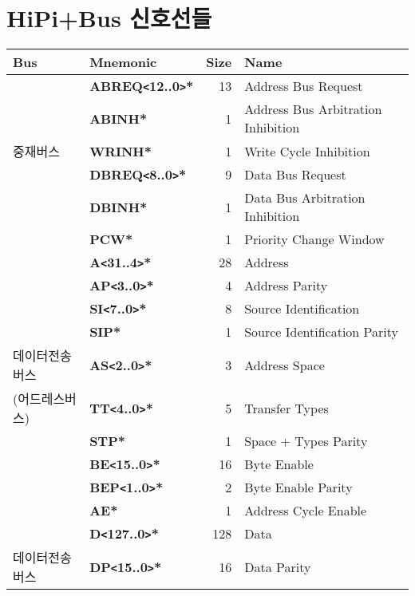 %
%
\begin{table}[htbp]
\section{HiPi+Bus 신호선들}
   \begin{center}
\begingroup
\setlength{\tabcolsep}{6pt} %
\renewcommand{\arraystretch}{0.9} %
   \begin{tabular}{|l|l|r|l|} \hline
Bus&Mnemonic & Size & Name \\ \hline \hline
     & {\bf ABREQ{\tt <}12..0{\tt >}*} & 13 & Address Bus Request \\
     & {\bf ABINH*}                    & 1 & Address Bus Arbitration Inhibition \\
중재버스 & {\bf WRINH*}                    & 1 & Write Cycle Inhibition \\
     & {\bf DBREQ{\tt <}8..0{\tt >}*}  & 9 & Data Bus Request \\
     & {\bf DBINH*}                    & 1 & Data Bus Arbitration Inhibition \\
     & {\bf PCW*}                      & 1 & Priority Change Window \\ \hline
         & {\bf A{\tt <}31..4{\tt >}*}     & 28 & Address \\
         & {\bf AP{\tt <}3..0{\tt >}*}     & 4 & Address Parity \\
         & {\bf SI{\tt <}7..0{\tt >}*}     & 8 & Source Identification \\
         & {\bf SIP*}                      & 1 & Source Identification Parity \\
데이터전송버스  & {\bf AS{\tt <}2..0{\tt >}*}     & 3 & Address Space \\
(어드레스버스) & {\bf TT{\tt <}4..0{\tt >}*}     & 5 & Transfer Types \\
         & {\bf STP*}                      & 1 & Space + Types Parity \\
         & {\bf BE{\tt <}15..0{\tt >}*}    & 16 & Byte Enable \\
         & {\bf BEP{\tt <}1..0{\tt >}*}    & 2 & Byte Enable Parity \\
         & {\bf AE*}                       & 1 & Address Cycle Enable \\ \hline
         & {\bf D{\tt <}127..0{\tt >}*}    & 128 & Data \\
데이터전송버스  & {\bf DP{\tt <}15..0{\tt >}*}    & 16 & Data Parity \\

\end{tabular}
\end{center}
\end{table}

